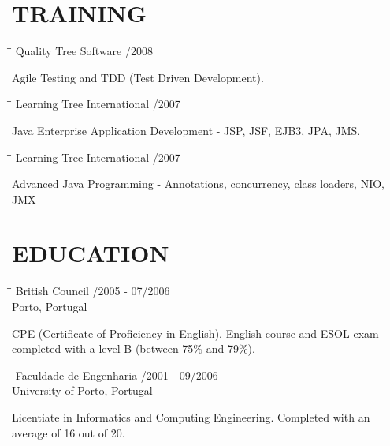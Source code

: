 \documentclass{res}
\begin{document}
\begin{resume}
\section{TRAINING}

\begin{tabbing}
\hspace{2.3in}\= \hspace{2.6in}\= \kill %
{\bf } \>Quality Tree Software    
/2008\\ \>
\end{tabbing}\vspace{-20pt}
Agile Testing and TDD (Test Driven Development).

\begin{tabbing}
\hspace{2.3in}\= \hspace{2.6in}\= \kill %
{\bf } \>Learning Tree International    
/2007\\ \>
\end{tabbing}\vspace{-20pt}
Java Enterprise Application Development - JSP, JSF, EJB3, JPA, JMS.

\begin{tabbing}
\hspace{2.3in}\= \hspace{2.6in}\= \kill %
{\bf } \>Learning Tree International    
/2007\\ \>
\end{tabbing}\vspace{-20pt}
Advanced Java Programming - Annotations, concurrency, class loaders, NIO, JMX

\section{EDUCATION}

\begin{tabbing}
\hspace{2.3in}\= \hspace{2.6in}\= \kill %
{\bf } \>British Council
/2005 - 07/2006\\ \>Porto, Portugal
\end{tabbing}\vspace{-20pt}
CPE (Certificate of Proficiency in English).
English course and ESOL exam completed with a level B (between 75\% and 79\%).

\begin{tabbing}
\hspace{2.3in}\= \hspace{2.6in}\= \kill %
{\bf } \>Faculdade de Engenharia
/2001 - 09/2006\\ \>University of Porto, Portugal
\end{tabbing}\vspace{-20pt}
Licentiate in Informatics and Computing Engineering.
Completed with an average of 16 out of 20.

\end{resume}
\end{document}
